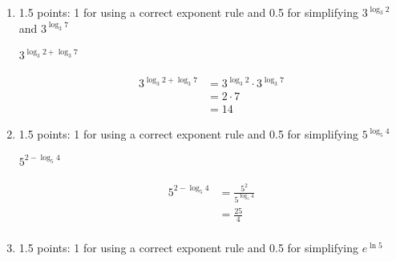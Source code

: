 \documentclass{article}
\begin{document}
\begin{enumerate}
\begin{enumerate}
\begin{enumerate}
      \begin{solution}
        $5$
      \end{solution}

    \item

      \begin{grading}
        1.5 points: 1 for using a correct exponent rule and 0.5 for
        simplifying $3^{\log_3 2}$ and $3^{\log_3 7}$
      \end{grading}

      \begin{problem}[\vfill]
        $3^{\log_3 2 + \log_3 7}$
      \end{problem}

      \begin{solution}
        \begin{align*}
          3^{\log_3 2 + \log_3 7} &= 3^{\log_3 2} \cdot 3^{\log_3 7} \\
          &= 2 \cdot 7 \\
          &= \boxed{14}
        \end{align*}
      \end{solution}

    \item

      \begin{grading}
        1.5 points: 1 for using a correct exponent rule and 0.5 for
        simplifying $5^{\log_5 4}$
      \end{grading}

      \begin{problem}[\vfill]
        $\displaystyle 5^{2 - \log_5 4}$
      \end{problem}

      \begin{solution}
        \begin{align*}
          5^{2 - \log_5 4} &= \frac{5^2}{5^{\log_5 4}} \\
          &= \boxed{\frac{25}{4}} \\
        \end{align*}
      \end{solution}

    \item

      \begin{grading}
        1.5 points: 1 for using a correct exponent rule and 0.5 for
        simplifying $e^{\ln 5}$
      \end{grading}


\end{enumerate}
\end{enumerate}
\end{enumerate}
\end{document}
